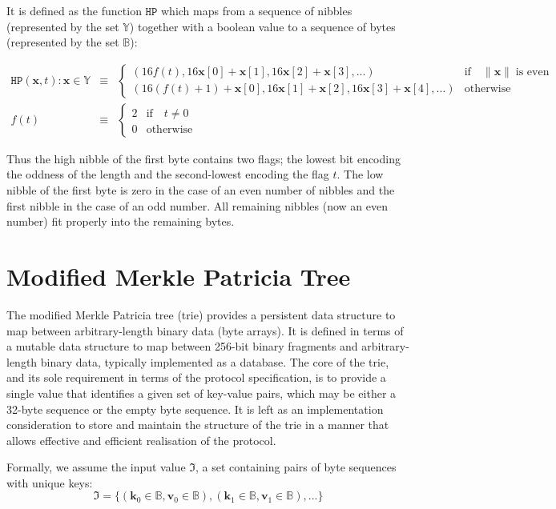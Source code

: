 \documentclass[9pt,oneside]{amsart}
\makeatletter
\newcommand{\linkdest}[1]{\Hy@raisedlink{\hypertarget{#1}{}}}
\makeatother
\begin{document}
It is defined as the function $\mathtt{HP}$ which maps from a sequence of nibbles (represented by the set \linkdest{set_of_sequence_of_nibbles}$\mathbb{Y}$) together with a boolean value to a sequence of bytes (represented by the set $\mathbb{B}$):

\begin{eqnarray}
\mathtt{HP}(\mathbf{x}, t): \mathbf{x} \in \mathbb{Y} & \equiv & \begin{cases}
(16f(t), 16\mathbf{x}[0] + \mathbf{x}[1], 16\mathbf{x}[2] + \mathbf{x}[3], ...) &
\text{if} \quad \lVert \mathbf{x} \rVert \; \text{is even} \\
(16(f(t) + 1) + \mathbf{x}[0], 16\mathbf{x}[1] + \mathbf{x}[2], 16\mathbf{x}[3] + \mathbf{x}[4], ...) &
\text{otherwise}
\end{cases} \\
f(t) & \equiv & \begin{cases} 2 & \text{if} \quad t \neq 0 \\ 0 & \text{otherwise} \end{cases}
\end{eqnarray}

Thus the high nibble of the first byte contains two flags; the lowest bit encoding the oddness of the length and the second-lowest encoding the flag $t$. The low nibble of the first byte is zero in the case of an even number of nibbles and the first nibble in the case of an odd number. All remaining nibbles (now an even number) fit properly into the remaining bytes.

\section{Modified Merkle Patricia Tree}\label{app:trie}\hypertarget{trie}{}
The modified Merkle Patricia tree (trie) provides a persistent data structure to map between arbitrary-length binary data (byte arrays). It is defined in terms of a mutable data structure to map between 256-bit binary fragments and arbitrary-length binary data, typically implemented as a database. The core of the trie, and its sole requirement in terms of the protocol specification, is to provide a single value that identifies a given set of key-value pairs, which may be either a 32-byte sequence or the empty byte sequence. It is left as an implementation consideration to store and maintain the structure of the trie in a manner that allows effective and efficient realisation of the protocol.

Formally, we assume the input value $\mathfrak{I}$, a set containing pairs of byte sequences with unique keys:
\begin{equation}
\mathfrak{I} = \{ (\mathbf{k}_0 \in \mathbb{B}, \mathbf{v}_0 \in \mathbb{B}), (\mathbf{k}_1 \in \mathbb{B}, \mathbf{v}_1 \in \mathbb{B}), ... \}
\end{equation}
\end{document}
